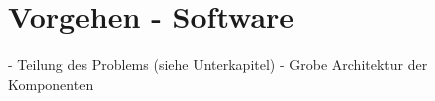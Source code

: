 \chapter{Vorgehen - Software} \label{vorgehenSW}

\nocite{*}
- Teilung des Problems (siehe Unterkapitel)
- Grobe Architektur der Komponenten
